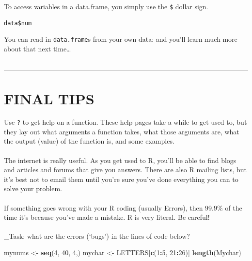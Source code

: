 \documentclass[
]{book}
\newenvironment{Shaded}{\begin{snugshade}}{\end{snugshade}}
\newcommand{\DecValTok}[1]{\textcolor[rgb]{0.00,0.00,0.81}{#1}}
\newcommand{\KeywordTok}[1]{\textcolor[rgb]{0.13,0.29,0.53}{\textbf{#1}}}
\newcommand{\NormalTok}[1]{#1}
\newcommand{\OperatorTok}[1]{\textcolor[rgb]{0.81,0.36,0.00}{\textbf{#1}}}
\newcommand{\StringTok}[1]{\textcolor[rgb]{0.31,0.60,0.02}{#1}}
\begin{document}
To access variables in a data.frame, you simply use the \texttt{\$} dollar sign.

\begin{verbatim}
data$num
\end{verbatim}

You can read in \texttt{data.frame}s from your own data: and you'll learn much more
about that next time\ldots{}\\
~\\

\begin{center}\rule{0.5\linewidth}{\linethickness}\end{center}

\hypertarget{final-tips}{%
\section{FINAL TIPS}\label{final-tips}}

Use \texttt{?} to get help on a function. These help pages take a while to get used
to, but they lay out what arguments a function takes, what those arguments
are, what the output (value) of the function is, and some examples.\\
~\\

The internet is really useful. As you get used to R, you'll be able to find
blogs and articles and forums that give you answers. There are also R mailing
lists, but it's best not to email them until you're sure you've done everything
you can to solve your problem.\\
~\\

If something goes wrong with your R coding (usually Errors), then 99.9\% of the
time it's because you've made a mistake. R is very literal. Be careful!\\
~\\

\_Task: what are the errors (`bugs') in the lines of code below?

\begin{Shaded}
\begin{Highlighting}[]
\NormalTok{mynums <-}\StringTok{ }\KeywordTok{seq}\NormalTok{(}\DecValTok{4}\NormalTok{, }\DecValTok{40}\NormalTok{, }\DecValTok{4}\NormalTok{,)}
\NormalTok{mychar <-}\StringTok{ }\NormalTok{LETTERS[}\KeywordTok{c}\NormalTok{(}\DecValTok{1}\OperatorTok{:}\DecValTok{5}\NormalTok{, }\DecValTok{21}\OperatorTok{:}\DecValTok{26}\NormalTok{)]}
\KeywordTok{length}\NormalTok{(Mychar)}
\end{Highlighting}
\end{Shaded}
\end{document}
